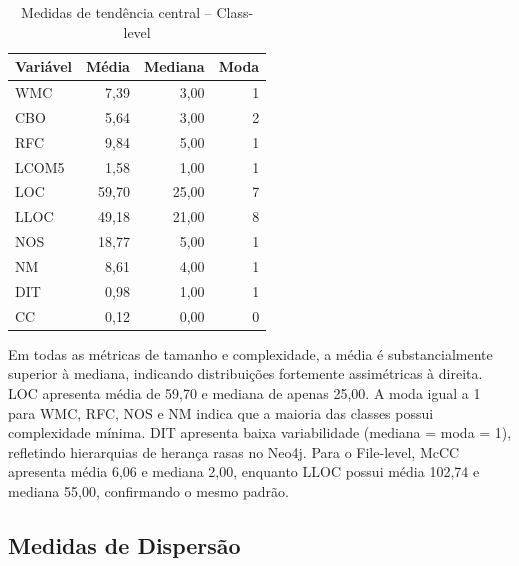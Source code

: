 \documentclass[conference]{IEEEtran}
\begin{document}
\begin{table}[htbp]
\caption{Medidas de tendência central -- Class-level}
\label{tab:tendencia_class}
\centering
\footnotesize
\begin{tabular}{lrrr}
\toprule
\textbf{Variável} & \textbf{Média} & \textbf{Mediana} & \textbf{Moda} \\
\midrule
WMC   &  7,39  &  3,00  &  1 \\
CBO   &  5,64  &  3,00  &  2 \\
RFC   &  9,84  &  5,00  &  1 \\
LCOM5 &  1,58  &  1,00  &  1 \\
LOC   & 59,70  & 25,00  &  7 \\
LLOC  & 49,18  & 21,00  &  8 \\
NOS   & 18,77  &  5,00  &  1 \\
NM    &  8,61  &  4,00  &  1 \\
DIT   &  0,98  &  1,00  &  1 \\
CC    &  0,12  &  0,00  &  0 \\
\bottomrule
\end{tabular}
\end{table}

Em todas as métricas de tamanho e complexidade, a média é substancialmente superior à mediana, indicando distribuições fortemente assimétricas à direita. LOC apresenta média de 59,70 e mediana de apenas 25,00. A moda igual a 1 para WMC, RFC, NOS e NM indica que a maioria das classes possui complexidade mínima. DIT apresenta baixa variabilidade (mediana = moda = 1), refletindo hierarquias de herança rasas no Neo4j. Para o File-level, McCC apresenta média 6,06 e mediana 2,00, enquanto LLOC possui média 102,74 e mediana 55,00, confirmando o mesmo padrão.

\subsection{Medidas de Dispersão}
\end{document}

